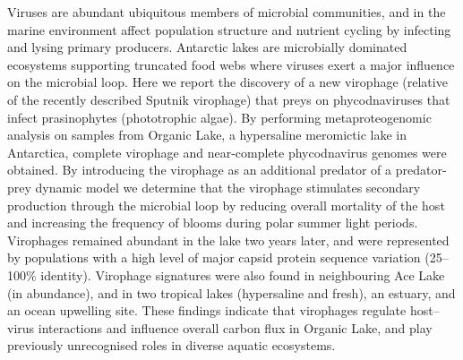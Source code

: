 Viruses are abundant ubiquitous members of microbial communities, and in the marine environment affect population structure and nutrient cycling by infecting and lysing primary producers. 
Antarctic lakes are microbially dominated ecosystems supporting truncated food webs where viruses exert a major influence on the microbial loop. 
Here we report the discovery of a new virophage (relative of the recently described Sputnik virophage) that preys on phycodnaviruses that infect prasinophytes (phototrophic algae). 
By performing metaproteogenomic analysis on samples from Organic Lake, a hypersaline meromictic lake in Antarctica, complete virophage and near-complete phycodnavirus genomes were obtained. 
By introducing the virophage as an additional predator of a predator-prey dynamic model we determine that the virophage stimulates secondary production through the microbial loop by reducing overall mortality of the host and increasing the frequency of blooms during polar summer light periods. 
Virophages remained abundant in the lake two years later, and were represented by populations with a high level of major capsid protein sequence variation (25--100\% identity). 
Virophage signatures were also found in neighbouring Ace Lake (in abundance), and in two tropical lakes (hypersaline and fresh), an estuary, and an ocean upwelling site. 
These findings indicate that virophages regulate host--virus interactions and influence overall carbon flux in Organic Lake, and play previously unrecognised roles in diverse aquatic ecosystems.
\newpage

